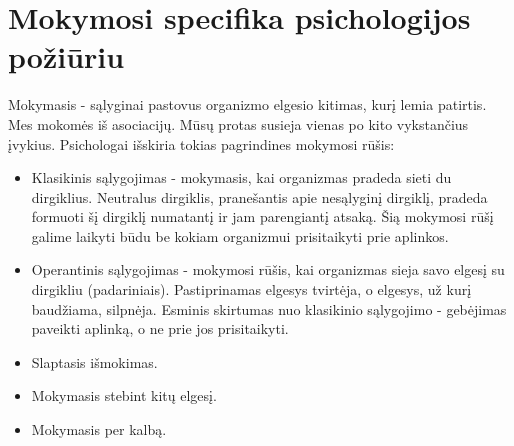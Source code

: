 \documentclass{article}
\begin{document}

\newpage
\section{Mokymosi specifika psichologijos požiūriu}\hypertarget{mspp}{}
Mokymasis - sąlyginai pastovus organizmo elgesio kitimas, kurį lemia patirtis. Mes mokomės iš asociacijų. Mūsų protas susieja vienas po kito vykstančius įvykius. Psichologai išskiria tokias pagrindines mokymosi rūšis: 
\begin{itemize}
\item Klasikinis sąlygojimas - mokymasis, kai organizmas pradeda sieti du dirgiklius. Neutralus dirgiklis, pranešantis
apie nesąlyginį dirgiklį, pradeda formuoti šį dirgiklį numatantį ir jam parengiantį atsaką. Šią mokymosi rūšį galime laikyti būdu be kokiam organizmui prisitaikyti prie aplinkos. 
\item Operantinis sąlygojimas - mokymosi rūšis, kai organizmas sieja savo elgesį su dirgikliu (padariniais). Pastiprinamas elgesys tvirtėja, o elgesys, už kurį baudžiama, silpnėja. Esminis skirtumas nuo klasikinio sąlygojimo - gebėjimas paveikti aplinką, o ne prie jos prisitaikyti.
\item Slaptasis išmokimas.
\item Mokymasis stebint kitų elgesį.
\item Mokymasis per kalbą.
\end{itemize}
\end{document}
